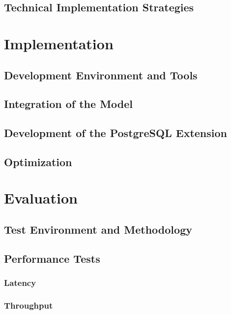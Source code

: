 \documentclass{article}
\begin{document}
\subsection{Technical Implementation Strategies}

\newpage

\section{Implementation}

\subsection{Development Environment and Tools}

\subsection{Integration of the Model}


\subsection{Development of the PostgreSQL Extension}


\subsection{Optimization}

\newpage

\section{Evaluation}


\subsection{Test Environment and Methodology}

\subsection{Performance Tests}
\subsubsection{Latency}
\subsubsection{Throughput}
\end{document}
